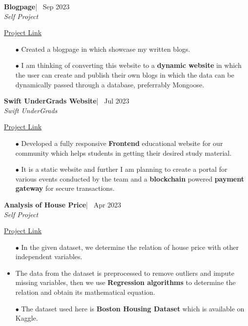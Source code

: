 \documentclass[10pt]{article}
\begin{document}
\textbf{\large{Blogpage}}|  \hfill {\ \small Sep 2023}
\\[0.05cm]
\emph{Self Project} \hfill {\href{https://sharathblogs.vercel.app}{\underline{Project Link} }
\\[-0.6cm]	
	\begin{itemize}[itemsep = -0.75 mm]
	\item[{\color[RGB]{0,109,204}$\bullet$}] \noindent Created a blogpage in which showcase my written blogs.
        \item[{\color[RGB]{0,109,204}$\bullet$}] \noindent I am thinking of converting this website to a \textbf{dynamic website} in which the user can create and publish their own blogs in which the data can be dynamically passed through a database, preferrably Mongoose.
	\end{itemize} 
\textbf{\large{Swift UnderGrads Website}}|  \hfill {\ \small Jul 2023}
\\[0.05cm]
\emph{Swift UnderGrads} \hfill {\href{https://www.swiftundergrads.in}{\underline{Project Link} }
\\[-0.6cm]	
	\begin{itemize}[itemsep = -0.75 mm]
	\item[{\color[RGB]{0,109,204}$\bullet$}] \noindent Developed a fully responsive \textbf{Frontend} educational website for our community which helps students in getting their desired study material.
        \item[{\color[RGB]{0,109,204}$\bullet$}] \noindent It is a static website  and further I am planning to create a portal for various events conducted by the team and a \textbf{blockchain} powered \textbf{payment gateway} for secure transactions.
	\end{itemize} 
\textbf{\large{Analysis of House Price}}|  \hfill {\ \small Apr 2023}
\\[0.05cm]
\emph{Self Project} \hfill {\href{https://github.com/Sharath1036/regression-analysis-of-house-price}{\underline{Project Link} }
\\[-0.6cm]	
	\begin{itemize}[itemsep = -0.75 mm]
	\item[{\color[RGB]{0,109,204}$\bullet$}] \noindent In the given dataset, we determine the relation of house price with other independent variables.
        \item The data from the dataset is preprocessed to remove outliers and impute missing variables, then we use \textbf{Regression algorithms} to determine the relation and obtain its mathematical equation.
        \item[{\color[RGB]{0,109,204}$\bullet$}] \noindent The dataset used here is \textbf{Boston Housing Dataset} which is available on Kaggle.
	\end{itemize} 
\vspace{-15pt}


}}}
\end{document}
